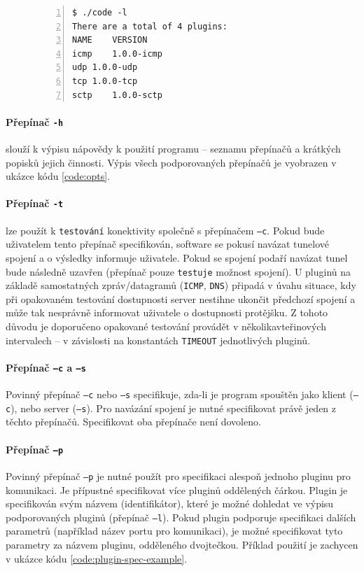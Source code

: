 \documentclass[thesis=M,czech]{FITthesis}[2012/10/20]
\begin{document}
    \begin{figure}[h]
	\begin{lstlisting}[label=code:listplugins,caption=Výpis jmen a verzí podporovaných pluginů,frame=single,numbers=left]
$ ./code -l
There are a total of 4 plugins:
NAME	VERSION
icmp	1.0.0-icmp
udp	1.0.0-udp
tcp	1.0.0-tcp
sctp	1.0.0-sctp
      \end{lstlisting}
    \end{figure}
    
    \paragraph{Přepínač \texttt{-h}} slouží k výpisu nápovědy k použití programu -- seznamu přepínačů a krátkých popisků jejich činnosti. Výpis všech podporovaných přepínačů je vyobrazen v ukázce kódu \ref{code:opts}.
    
    \paragraph{Přepínač \texttt{-t}} lze použít k \texttt{testování} konektivity společně s přepínačem \texttt{--c}. Pokud bude uživatelem tento přepínač specifikován, software se pokusí navázat tunelové spojení a o výsledky informuje uživatele. Pokud se spojení podaří navázat tunel bude následně uzavřen (přepínač pouze \texttt{testuje} možnost spojení). U pluginů na základě samostatných zpráv/datagramů (\texttt{ICMP}, \texttt{DNS}) připadá v úvahu situace, kdy při opakovaném testování dostupnosti server nestihne ukončit předchozí spojení a může tak nesprávně informovat uživatele o dostupnosti protějšku. Z tohoto důvodu je doporučeno opakované testování provádět v několikavteřinových intervalech -- v závislosti na konstantách \texttt{TIMEOUT} jednotlivých pluginů.
    
    \paragraph{Přepínač \texttt{--c} a \texttt{--s}} Povinný přepínač \texttt{--c} nebo \texttt{--s} specifikuje, zda-li je program spouštěn jako klient (\texttt{--c}), nebo server (\texttt{--s}). Pro navázání spojení je nutné specifikovat právě jeden z těchto přepínačů. Specifikovat oba přepínače není dovoleno.
    
    \paragraph{Přepínač \texttt{--p}} Povinný přepínač \texttt{--p} je nutné použít pro specifikaci alespoň jednoho pluginu pro komunikaci. Je přípustné specifikovat více pluginů oddělených čárkou. Plugin je specifikován svým názvem (identifikátor), které je možné dohledat ve výpisu podporovaných pluginů (přepínač \texttt{--l}). Pokud plugin podporuje specifikaci dalších parametrů (například název portu pro komunikaci), je možné specifikovat tyto parametry za názvem pluginu, odděleného dvojtečkou. Příklad použití je zachycen v ukázce kódu \ref{code:plugin-spec-example}.
    
\end{document}
